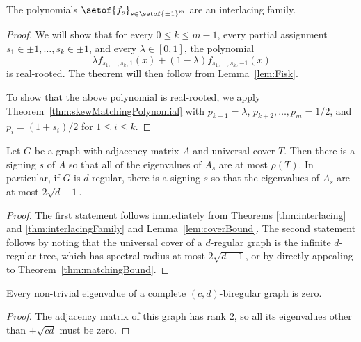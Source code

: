 \documentclass[11pt]{article}
\begin{document}
\begin{theorem}\label{thm:interlacingFamily}
The polynomials $\setof{f_{s}}_{s \in \setof{\pm 1}^{m}}$
  are an interlacing family.
\end{theorem}
\begin{proof}
We will show that for every
  $0 \leq k \leq m-1$,
  every partial assignment $s_{1} \in \pm 1, \dotsc , s_{k} \in \pm 1$,
  and every $\lambda \in [0,1]$,
 the polynomial
\[
  \lambda f_{s_{1}, \dotsc , s_{k}, 1} (x) + 
  (1-\lambda ) f_{s_{1}, \dotsc , s_{k}, -1} (x)
\]
is real-rooted.
The theorem will then follow from Lemma~\ref{lem:Fisk}.

To show that the above polynomial is real-rooted, we
  apply Theorem~\ref{thm:skewMatchingPolynomial} 
  with $p_{k+1} = \lambda$, 
  $p_{k+2}, \dotsc , p_{m} = 1/2$,
  and $p_{i} = (1+s_{i})/2$ for $1 \leq i \leq k$.
\end{proof}

\begin{theorem}\label{thm:goodLift}
Let $G$ be a graph with adjacency matrix $A$ and universal cover $T$. Then there
is a signing $s$ of $A$ so that all of the eigenvalues of $A_s$ are at most
$\rho(T)$. 
In particular, if $G$ is $d$-regular, there is a signing $s$ so that the eigenvalues of $A_s$ are at most
$2\sqrt{d-1}$.
\end{theorem}
\begin{proof}
The first statement follows immediately from Theorems
 \ref{thm:interlacing} and \ref{thm:interlacingFamily} and Lemma~\ref{lem:coverBound}.
The second statement follows by noting that the universal cover of a $d$-regular
 graph is the infinite $d$-regular tree, which has spectral radius at most $2\sqrt{d-1}$,
 or by directly appealing to Theorem~\ref{thm:matchingBound}.
\end{proof}

\begin{lemma}\label{lem:completeBipartite}
Every non-trivial eigenvalue of a complete $(c,d)$-biregular graph
  is zero.
\end{lemma}
\begin{proof}
The adjacency matrix of this graph has rank $2$, so all its
  eigenvalues other than $\pm \sqrt{cd}$
  must be zero.
\end{proof}
\end{document}
